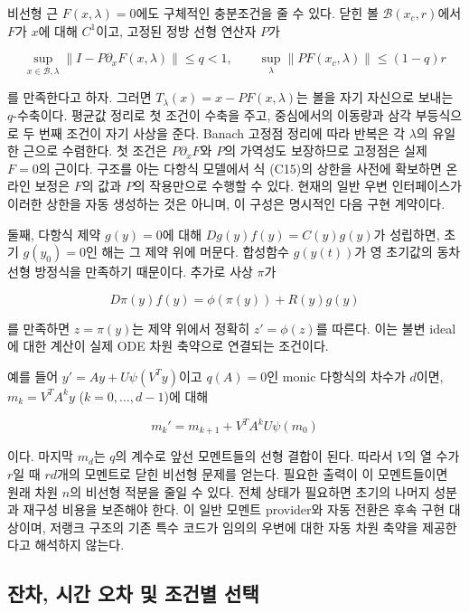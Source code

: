 \documentclass[
  10pt,
  dvipsnames]{article}
\begin{document}
비선형 근 \(F(x,\lambda)=0\)에도 구체적인 충분조건을 줄 수 있다. 닫힌 볼
\(\mathcal B(x_c,r)\)에서 \(F\)가 \(x\)에 대해 \(C^1\)이고, 고정된 정방
선형 연산자 \(P\)가

\[
 \sup_{x\in\mathcal B,\lambda}\|I-P\partial_xF(x,\lambda)\|\le q<1,
 \qquad \sup_\lambda\|PF(x_c,\lambda)\|\le(1-q)r
 \tag{C15}
\]

를 만족한다고 하자. 그러면 \(T_\lambda(x)=x-PF(x,\lambda)\)는 볼을 자기
자신으로 보내는 \(q\)-수축이다. 평균값 정리로 첫 조건이 수축을 주고,
중심에서의 이동량과 삼각 부등식으로 두 번째 조건이 자기 사상을 준다.
Banach 고정점 정리에 따라 반복은 각 \(\lambda\)의 유일한 근으로
수렴한다. 첫 조건은 \(P\partial_xF\)와 \(P\)의 가역성도 보장하므로
고정점은 실제 \(F=0\)의 근이다. 구조를 아는 다항식 모델에서 식 (C15)의
상한을 사전에 확보하면 온라인 보정은 \(F\)의 값과 \(P\)의 작용만으로
수행할 수 있다. 현재의 일반 우변 인터페이스가 이러한 상한을 자동
생성하는 것은 아니며, 이 구성은 명시적인 다음 구현 계약이다.

둘째, 다항식 제약 \(g(y)=0\)에 대해 \(Dg(y)f(y)=C(y)g(y)\)가 성립하면,
초기 \(g(y_0)=0\)인 해는 그 제약 위에 머문다. 합성함수 \(g(y(t))\)가 영
초기값의 동차 선형 방정식을 만족하기 때문이다. 추가로 사상 \(\pi\)가

\[
 D\pi(y)f(y)=\phi(\pi(y))+R(y)g(y)
 \tag{C16}
\]

를 만족하면 \(z=\pi(y)\)는 제약 위에서 정확히 \(z'=\phi(z)\)를 따른다.
이는 불변 ideal에 대한 계산이 실제 ODE 차원 축약으로 연결되는 조건이다.

예를 들어 \(y'=Ay+U\psi(V^Ty)\)이고 \(q(A)=0\)인 monic 다항식의 차수가
\(d\)이면, \(m_k=V^TA^ky\) (\(k=0,\ldots,d-1\))에 대해

\[
 m_k'=m_{k+1}+V^TA^kU\psi(m_0)
 \tag{C17}
\]

이다. 마지막 \(m_d\)는 \(q\)의 계수로 앞선 모멘트들의 선형 결합이 된다.
따라서 \(V\)의 열 수가 \(r\)일 때 \(rd\)개의 모멘트로 닫힌 비선형 문제를
얻는다. 필요한 출력이 이 모멘트들이면 원래 차원 \(n\)의 비선형 적분을
줄일 수 있다. 전체 상태가 필요하면 초기의 나머지 성분과 재구성 비용을
보존해야 한다. 이 일반 모멘트 provider와 자동 전환은 후속 구현 대상이며,
저랭크 구조의 기존 특수 코드가 임의의 우변에 대한 자동 차원 축약을
제공한다고 해석하지 않는다.

\hypertarget{uxc794uxcc28-uxc2dcuxac04-uxc624uxcc28-uxbc0f-uxc870uxac74uxbcc4-uxc120uxd0dd}{%
\subsection{잔차, 시간 오차 및 조건별
선택}\label{uxc794uxcc28-uxc2dcuxac04-uxc624uxcc28-uxbc0f-uxc870uxac74uxbcc4-uxc120uxd0dd}}
\end{document}
